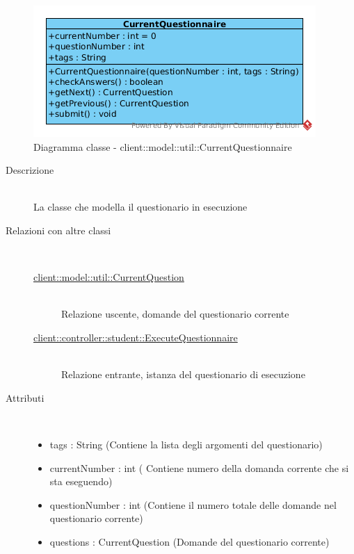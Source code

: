 \begin{center}
			\begin{figure}[H]
				\centering \includegraphics[scale=4, max width=\textwidth, max height=\myheight]{../img/diagrammiClassi/client/model/util/CurrentQuestionnaire.png}
				\caption{Diagramma classe - client::model::util::CurrentQuestionnaire}
			\end{figure}
		\end{center}\begin{description}
\item[Descrizione] \hfill \\
 La classe che modella il questionario in esecuzione
\item[Relazioni con altre classi] \hfill \\
 \vspace{-7mm}
\begin{description}
\item[\hyperlink{client::model::util::CurrentQuestion}{client::model::util::CurrentQuestion}] \hfill \\
 Relazione uscente, domande del questionario corrente
\item[\hyperlink{client::controller::student::ExecuteQuestionnaire}{client::controller::student::ExecuteQuestionnaire}] \hfill \\
 Relazione entrante, istanza del questionario di esecuzione
\end{description}

\item[Attributi] \hfill \\
 \vspace{-7mm}
\begin{itemize}
\item tags : String (Contiene la lista degli argomenti del questionario)
\item currentNumber : int ( Contiene numero della domanda corrente che si sta eseguendo)
\item questionNumber : int (Contiene il numero totale delle domande nel questionario corrente)
\item questions : CurrentQuestion (Domande del questionario corrente)
\end{itemize}


\end{description}
